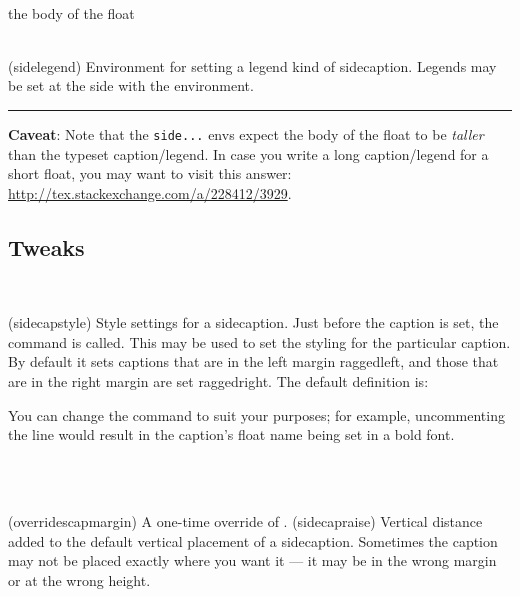 \begin{syntax}
 \\
 the body of the float \\
 \\
\end{syntax}
\glossary(sidelegend)%
  {}%
  {Environment for setting a legend kind of sidecaption.}%
Legends may be set at the side with the  environment.

\fancybreak{}

\textbf{Caveat}: Note that the \texttt{side...} envs expect the body
of the float to be \emph{taller} than the typeset caption/legend. In
case you write a long caption/legend for a short float, you may want
to visit this answer:
\url{http://tex.stackexchange.com/a/228412/3929}.


\subsection{Tweaks}

\begin{syntax}
\cmd{\sidecapstyle} \\
\end{syntax}
\glossary(sidecapstyle)%
  {}%
  {Style settings for a sidecaption.}%
Just before the caption is set, the \cmd{\sidecapstyle} command is called.
This may be used to set the styling for the particular caption. By default
it sets captions that are in the left margin raggedleft, and those
that are in the right margin are set raggedright. The default definition
is:
\begin{shadecode}
\newcommand*{\sidecapstyle}{%
  \ifscapmargleft
    \captionstyle{\raggedleft}%
  \else
    \captionstyle{\raggedright}%
  \fi}
\end{shadecode}
 You can change the command to suit your purposes; for example, uncommenting
the \cmd{\captionnamefont} line would result in the caption's float name being
set in a bold font. 

\begin{syntax}
\cmd{\overridescapmargin} \\
\lnc{\sidecapraise} \\
\end{syntax}
\glossary(overridescapmargin)%
  {}%
  {A one-time override of .}%
\glossary(sidecapraise)%
  {}%
  {Vertical distance added to the default vertical placement of a sidecaption.}%
Sometimes the caption may not be placed exactly where you want it --- it
may be in the wrong margin or at the wrong height.

